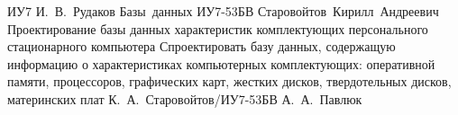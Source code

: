 \makecourseworktask
{ИУ7}
{И.~В.~Рудаков}
{Базы~данных}
{ИУ7-53БВ}
{Старовойтов~Кирилл~Андреевич}
{Проектирование базы данных характеристик комплектующих персонального стационарного компьютера}
{Спроектировать базу данных, содержащую информацию о характеристиках компьютерных комплектующих: оперативной памяти, процессоров, графических карт, жестких дисков, твердотельных дисков, материнских плат}
{К.~А.~Старовойтов/ИУ7-53БВ}
{А.~А.~Павлюк}
